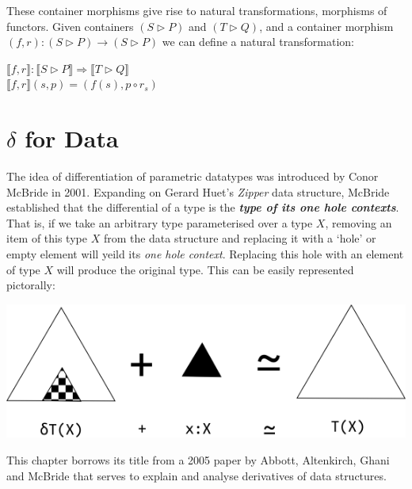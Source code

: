 \documentclass[12pt]{report}
\begin{document}
\newpage
These container morphisms give rise to natural transformations, morphisms of functors. Given containers $ (S \rhd P)$ and $ (T \rhd Q)$, and a container morphism $ (f , r) : (S \rhd P) \to (S \rhd P)$ we can define a natural transformation:
\begin{center}
$ \llbracket f,r\rrbracket : \llbracket S \rhd P\rrbracket \Rightarrow \llbracket T \rhd Q\rrbracket$ \\
$  \llbracket f,r\rrbracket (s,p) = (f(s),p \circ r_s) $
\end{center}


\chapter{$\delta$ for Data}
The idea of differentiation of parametric datatypes was introduced by Conor McBride in 2001. Expanding on Gerard Huet's \textit{Zipper} data structure\cite{zipper}, McBride established that the differential of a type is the \textbf{\textit{type of its one hole contexts}}. That is, if we take an arbitrary type parameterised over a type $X$, removing an item of this type $X$ from the data structure and replacing it with a `hole' or empty element will yeild its \textit{one hole context}. Replacing this hole with an element of type $X$ will produce the original type. This can be easily represented pictorally:
\begin{center}
\includegraphics[scale=0.6]{5.png}
\end{center} 
This chapter borrows its title from a 2005 paper by Abbott, Altenkirch, Ghani and McBride that serves to explain and analyse derivatives of data structures.
\end{document}

